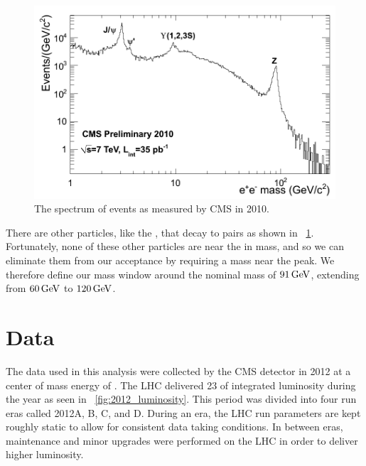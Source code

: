 \begin{figure}[tb]
    \centering
    \includegraphics[width=\textwidth]{figures/dielectron_mass_7tev.png}
    \caption{The spectrum of \ee events as measured by CMS in 2010.}
    \label{fig:ee_spectrum}
\end{figure}

There are other particles, like the \jpsi, that decay to \ee pairs as shown in
\FIG~\ref{fig:ee_spectrum}. Fortunately, none of these other particles are near
the \Z in mass, and so we can eliminate them from our acceptance by requiring a
mass near the \Z peak. We therefore define our mass window around the nominal
\Z mass of $91 \,\text{Ge\hspace{-.08em}V}$, extending from $60 \,\text{Ge\hspace{-.08em}V}$ to $120 \,\text{Ge\hspace{-.08em}V}$.

\section{Data}

The data used in this analysis were collected by the CMS detector in 2012 at a
center of mass energy of \rootseight. The LHC delivered 23 \fbinv of integrated
luminosity during the year as seen in \FIG~\ref{fig:2012_luminosity}. This
period was divided into four run eras called 2012A, B, C, and D. During an era,
the LHC run parameters are kept roughly static to allow for consistent data
taking conditions. In between eras, maintenance and minor upgrades were
performed on the LHC in order to deliver higher luminosity.

